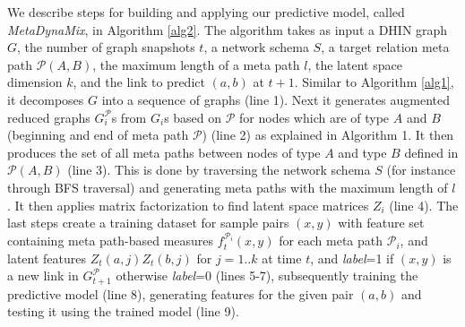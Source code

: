We describe steps for building and applying our predictive model, called \textit{MetaDynaMix}, in Algorithm \ref{alg2}. The algorithm takes as input a DHIN graph $G$, the number of graph snapshots $t$, a network schema $S$, a target relation meta path $\mathcal{P}(A,B)$, the maximum length of a meta path $l$, the latent space dimension $k$, and the link to predict $(a,b)$ at $t+1$. Similar to Algorithm \ref{alg1}, it decomposes $G$ into a sequence of graphs (line 1). Next it generates augmented reduced graphs $G^\mathcal{P}_i$s from $G_i$s based on $\mathcal{P}$ for nodes which are of type $A$ and $B$ (beginning and end of meta path $\mathcal{P}$) (line 2) as explained in Algorithm 1. It then produces the set of all meta paths between nodes of type $A$ and type $B$ defined in $\mathcal{P}(A,B)$ (line 3). This is done by traversing the network schema $S$ (for instance through BFS traversal) and generating meta paths with the maximum length of $l$. It then applies matrix factorization to find latent space matrices $Z_i$ (line 4). %
The last steps create a training dataset for sample pairs $(x,y)$ with feature set containing meta path-based measures $f^{\mathcal{P}_i}_t(x,y)$ for each meta path $\mathcal{P}_i$, and latent features $Z_t(a,j)Z_t(b,j)$ for $j=1..k$ at time $t$, and \textit{label}=1 if $(x,y)$ is a new link in $G^\mathcal{P}_{t+1}$ otherwise \textit{label}=0 (lines 5-7), subsequently training the predictive model (line 8), generating features for the given pair $(a,b)$ and testing it using the trained model (line 9). %







